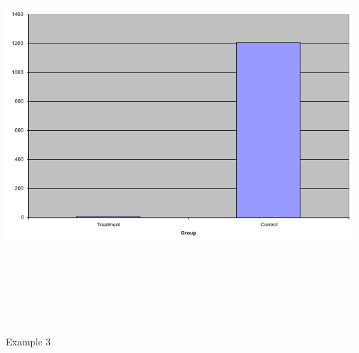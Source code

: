 \documentclass[12pt]{article}
\newcommand{\headsize}{\fontsize{35}{35} \selectfont}
\begin{document}
\vspace{30mm}

\centerline{\includegraphics[height=6in]{Figs/fig3c.png}}


\newpage


\headsize \color{myyellow}
\hfill \begin{minipage}{5.75in}
\centering
Example 3
\end{minipage}

\vspace{30mm}
\end{document}

